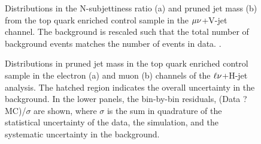 \begin{figure}[!htb]
\centering
{}
\caption{Distributions in the N-subjettiness ratio \nsubj (a) and pruned jet mass \mJ (b) from the top quark enriched control sample in the $\mu\nu$+V-jet channel. The \ttbar background is rescaled such that the total number of background events matches the number of events in data. .}
\label{fig:tt-controlPlots13TeV}
\end{figure}

\begin{figure}[!htb]
\centering
{}
\caption{ Distributions in pruned jet mass \mJ in the top quark enriched control sample in the electron (a) and muon (b) channels of the $\ell\nu$+H-jet analysis. The hatched region indicates the overall uncertainty in the background. In the lower panels, the bin-by-bin residuals, (Data ? MC)/$\sigma$ are shown, where $\sigma$ is the sum in quadrature of the statistical uncertainty of the data, the simulation, and the systematic uncertainty in the \ttbar background.}
\label{fig:tt-controlPlots8TeV}
\end{figure}

\begin{figure}[!htb]
\centering
{}
\caption{}
\label{fig:tt-mtop8TeV}
\end{figure}